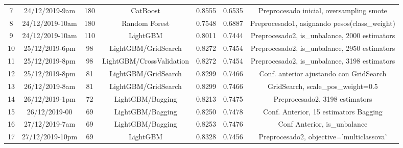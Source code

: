 \begin{table}[H]
{\begin{tabular}{ccccccc}
				7                   & 24/12/2019-9am          & 180           & CatBoost                         & 0.8555             & 0.6535             & Preprocesado inicial, oversampling smote                 \\
				8                   & 24/12/2019-10am         & 180           & Random Forest                    & 0.7548             & 0.6887             & Preprocesado1, asignando pesos(class\_weight)            \\
				9                   & 24/12/2019-10am         & 110           & LightGBM                         & 0.8011             & 0.7444             & Preprocesado2, is\_unbalance, 2000 estimators            \\
				10                  & 25/12/2019-6pm          & 98            & LightGBM/GridSearch              & 0.8272             & 0.7454             & Preprocesado2, is\_unbalance, 2950 estimators            \\
				11                  & 25/12/2019-8pm          & 98            & LightGBM/CrossValidation         & 0.8272             & 0.7454             & Preprocesado2, is\_unbalance, 3198 estimators            \\
				12                  & 25/12/2019-8pm          & 81            & LightGBM/GridSearch              & 0.8299             & 0.7466             & Conf. anterior ajustando con GridSearch                  \\
				13                  & 26/12/2019-8am          & 81            & LightGBM/GridSearch              & 0.8299             & 0.7466             & GridSearch, scale\_pos\_weight=0.5                       \\
				14                  & 26/12/2019-1pm          & 72            & LightGBM/Bagging                 & 0.8213             & 0.7475             & Preprocesado2, 3198 estimators                           \\
				15                  & 26/12/2019-00           & 69            & LightGBM/Bagging                 & 0.8250             & 0.7478             & Conf. Anterior, 15 estimators Bagging                    \\
				16                  & 27/12/2019-7am          & 69            & LightGBM/Bagging                 & 0.8253             & 0.7476             & Conf Anterior, is\_unbalance                             \\
				17                  & 27/12/2019-10pm         & 69            & LightGBM                         & 0.8328             & 0.7456             & Preprocesado2, objective='multiclassova'                 \\

\end{tabular}}
\end{table}
